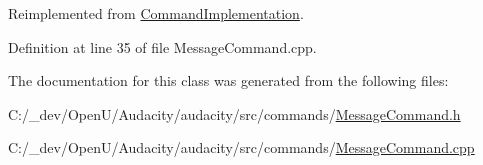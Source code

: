 Reimplemented from \hyperlink{class_command_implementation_a7b8787ad3b911316df9f097049a9eac3}{Command\+Implementation}.



Definition at line 35 of file Message\+Command.\+cpp.



The documentation for this class was generated from the following files\+:\begin{DoxyCompactItemize}
\item 
C\+:/\+\_\+dev/\+Open\+U/\+Audacity/audacity/src/commands/\hyperlink{_message_command_8h}{Message\+Command.\+h}\item 
C\+:/\+\_\+dev/\+Open\+U/\+Audacity/audacity/src/commands/\hyperlink{_message_command_8cpp}{Message\+Command.\+cpp}\end{DoxyCompactItemize}

